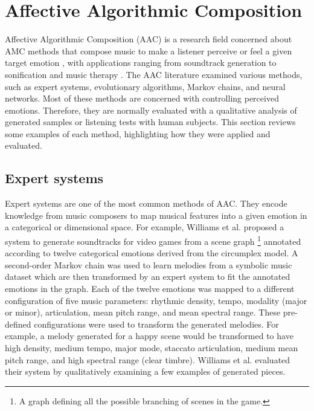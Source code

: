 \section{Affective Algorithmic Composition}

Affective Algorithmic Composition (AAC) is a research field concerned about AMC methods that compose music to make a listener perceive or feel a given target emotion \cite{williams2015investigating}, with applications ranging from soundtrack generation \cite{williams2015dynamic} to sonification \cite{Chen2015} and music therapy \cite{miranda2011brain}. The AAC literature examined various methods, such as expert systems, evolutionary algorithms, Markov chains, and neural networks. Most of these methods are concerned with controlling perceived emotions. Therefore, they are normally evaluated with a qualitative analysis of generated samples or listening tests with human subjects. This section reviews some examples of each method, highlighting how they were applied and evaluated.

\subsection{Expert systems}

Expert systems are one of the most common methods of AAC. They encode knowledge from music composers to map musical features into a given emotion in a categorical or dimensional space. For example, Williams et al. \cite{williams2015dynamic} proposed a system to generate soundtracks for video games from a scene graph \footnote{A graph defining all the possible branching of scenes in the game.} annotated according to twelve categorical emotions derived from the circumplex model. A second-order Markov chain was used to learn melodies from a symbolic music dataset which are then transformed by an expert system to fit the annotated emotions in the graph. Each of the twelve emotions was mapped to a different configuration of five music parameters: rhythmic density, tempo, modality (major or minor), articulation, mean pitch range, and mean spectral range. These pre-defined configurations were used to transform the generated melodies. For example, a melody generated for a happy scene would be transformed to have high density, medium tempo, major mode, staccato articulation, medium mean pitch range, and high spectral range (clear timbre).
Williams et al. \cite{williams2015dynamic} evaluated their system by qualitatively examining a few examples of generated pieces.

